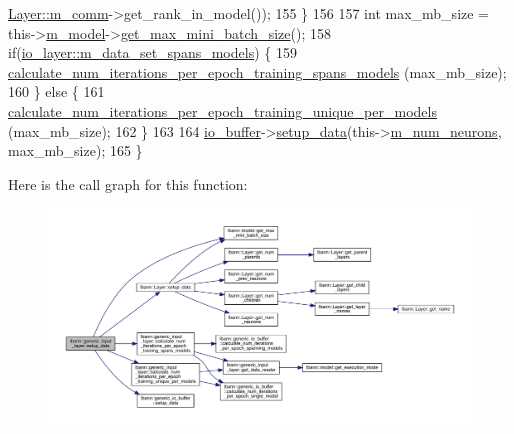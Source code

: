 \begin{DoxyCode}
      \hyperlink{classlbann_1_1Layer_a5de05c52f22e0bbd7c703bec3ad4dbf2}{Layer::m\_comm}->get\_rank\_in\_model());
155     \}
156 
157     \textcolor{keywordtype}{int} max\_mb\_size = this->\hyperlink{classlbann_1_1Layer_a3d9315e99574166f2f33e37b572021d2}{m\_model}->\hyperlink{classlbann_1_1model_a8c311798ff4acaeafdfbf85162ba5084}{get\_max\_mini\_batch\_size}();
158     \textcolor{keywordflow}{if}(\hyperlink{classlbann_1_1io__layer_a05c9d6e6cb12e8eb345ac6f5cb95644b}{io\_layer::m\_data\_set\_spans\_models}) \{
159       \hyperlink{classlbann_1_1generic__input__layer_af108a5dc05276bc6bc57b306204b12e4}{calculate\_num\_iterations\_per\_epoch\_training\_spans\_models}
      (max\_mb\_size);
160     \} \textcolor{keywordflow}{else} \{
161       \hyperlink{classlbann_1_1generic__input__layer_a0f09422a09e76da77ac42b3037173041}{calculate\_num\_iterations\_per\_epoch\_training\_unique\_per\_models}
      (max\_mb\_size);
162     \}
163 
164     \hyperlink{classlbann_1_1generic__input__layer_a9dfe8b9afaebc7a5bcb0177ee2ab428f}{io\_buffer}->\hyperlink{classlbann_1_1generic__io__buffer_a00f3920147f7f19eceb5336bd6ddb421}{setup\_data}(this->\hyperlink{classlbann_1_1Layer_a6b5ebc8a7d9329d8a773ed787e7b41d8}{m\_num\_neurons}, max\_mb\_size);
165   \}
\end{DoxyCode}
Here is the call graph for this function\+:\nopagebreak
\begin{figure}[H]
\begin{center}
\leavevmode
\includegraphics[width=350pt]{classlbann_1_1generic__input__layer_a8ca316b0369689949f3f4106920ec28f_cgraph}
\end{center}
\end{figure}
\mbox{\label{classlbann_1_1generic__input__layer_ad117da4e6155159439826bba6657cf05}} 
